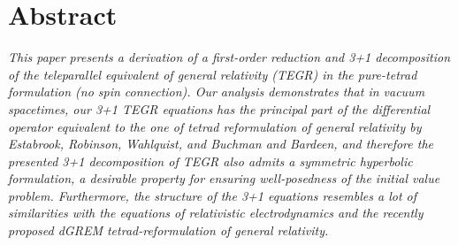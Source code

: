 \documentclass[
10pt, %
a4paper, %
oneside, %
twocolumn,
headinclude,footinclude, %
BCOR5mm, %
]{scrartcl}
\begin{document}
	\section*{Abstract} %
	\noindent
	\textit{ This paper presents a derivation of a first-order reduction and 3+1
	decomposition of the teleparallel equivalent of general relativity (TEGR) in
	the pure-tetrad formulation (no spin connection). Our analysis demonstrates
	that in vacuum spacetimes, our 3+1 TEGR equations has the principal part of
	the differential operator equivalent to the one of tetrad reformulation of
	general relativity by Estabrook, Robinson, Wahlquist, and Buchman and
	Bardeen, and therefore the presented 3+1 decomposition of TEGR also admits a
	symmetric hyperbolic formulation, a desirable property for ensuring
	well-posedness of the initial value problem. Furthermore, the structure of
	the 3+1 equations resembles a lot of similarities with the equations of
	relativistic electrodynamics and the recently proposed dGREM
	tetrad-reformulation of general relativity. }
	\renewcommand{\thefootnote}{\arabic{footnote}}
	
\end{document}
